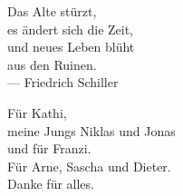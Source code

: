 
\thispagestyle{empty}


\vspace*{3cm}

\begin{center}
Das Alte stürzt, \\
es ändert sich die Zeit,\\
und neues Leben blüht \\
aus den Ruinen. \\ \medskip
--- Friedrich Schiller
\end{center}

\medskip

\begin{center}
Für Kathi, \\ meine Jungs Niklas und Jonas \\ und für Franzi. \\ Für Arne, Sascha und Dieter. \\ \medskip
Danke für alles.
\end{center}
